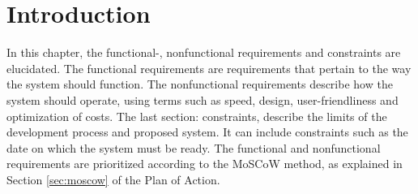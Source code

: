 \chapter{Introduction}
\thispagestyle{fancy}
In this chapter, the functional-, nonfunctional requirements and constraints are elucidated. The functional requirements are requirements that pertain to the way the system should function. The nonfunctional requirements describe how the system should operate, using terms such as speed, design, user-friendliness and optimization of costs. The last section: constraints, describe the limits of the development process and proposed system. It can include constraints such as the date on which the system must be ready. The functional and nonfunctional requirements are prioritized according to the MoSCoW method, as explained in Section \ref{sec:moscow} of the Plan of Action.